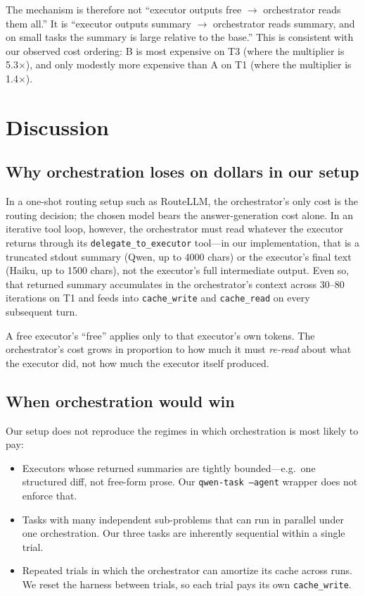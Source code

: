 \documentclass[11pt,a4paper]{article}
\begin{document}
The mechanism is therefore not ``executor outputs free $\to$ orchestrator reads them all.'' It is ``executor outputs summary $\to$ orchestrator reads summary, and on small tasks the summary is large relative to the base.'' This is consistent with our observed cost ordering: B is most expensive on T3 (where the multiplier is 5.3$\times$), and only modestly more expensive than A on T1 (where the multiplier is 1.4$\times$).

\section{Discussion}

\subsection{Why orchestration loses on dollars in our setup}

In a one-shot routing setup such as RouteLLM, the orchestrator's only cost is the routing decision; the chosen model bears the answer-generation cost alone. In an iterative tool loop, however, the orchestrator must read whatever the executor returns through its \texttt{delegate\_to\_executor} tool---in our implementation, that is a truncated stdout summary (Qwen, up to 4000 chars) or the executor's final text (Haiku, up to 1500 chars), not the executor's full intermediate output. Even so, that returned summary accumulates in the orchestrator's context across 30--80 iterations on T1 and feeds into \texttt{cache\_write} and \texttt{cache\_read} on every subsequent turn.

A free executor's ``free'' applies only to that executor's own tokens. The orchestrator's cost grows in proportion to how much it must \emph{re-read} about what the executor did, not how much the executor itself produced.

\subsection{When orchestration would win}

Our setup does not reproduce the regimes in which orchestration is most likely to pay:
\begin{itemize}
    \item Executors whose returned summaries are tightly bounded---e.g.\ one structured diff, not free-form prose. Our \texttt{qwen-task --agent} wrapper does not enforce that.
    \item Tasks with many independent sub-problems that can run in parallel under one orchestration. Our three tasks are inherently sequential within a single trial.
    \item Repeated trials in which the orchestrator can amortize its cache across runs. We reset the harness between trials, so each trial pays its own \texttt{cache\_write}.
\end{itemize}
\end{document}
